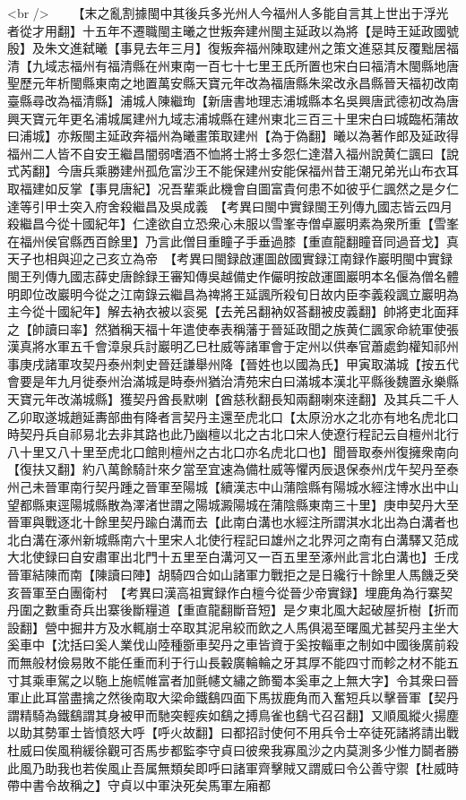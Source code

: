 <br />
　　【末之亂割據閩中其後兵多光州人今福州人多能自言其上世出于浮光者從才用翻】十五年不遷職閩主曦之世叛奔建州閩主延政以為將【是時王延政國號殷】及朱文進弑曦【事見去年三月】復叛奔福州陳取建州之策文進惡其反覆黜居福清【九域志福州有福清縣在州東南一百七十七里王氏所置也宋白曰福清木閩縣地唐聖歷元年析閩縣東南之地置萬安縣天寶元年改為福唐縣朱梁改永昌縣晉天福初改南臺縣尋改為福清縣】浦城人陳繼珣【新唐書地理志浦城縣本名吳興唐武德初改為唐興天寶元年更名浦城属建州九域志浦城縣在建州東北三百三十里宋白曰城臨柘蒲故曰浦城】亦叛閩主延政奔福州為曦畫策取建州【為于偽翻】曦以為著作郎及延政得福州二人皆不自安王繼昌闇弱嗜酒不恤將士將士多怨仁達潜入福州說黄仁諷曰【說式芮翻】今唐兵乘勝建州孤危富沙王不能保建州安能保福州昔王潮兄弟光山布衣耳取福建如反掌【事見唐紀】况吾輩乘此機會自圖富貴何患不如彼乎仁諷然之是夕仁達等引甲士突入府舍殺繼昌及吳成義　【考異曰閩中實録閩王列傳九國志皆云四月殺繼昌今從十國紀年】仁達欲自立恐衆心未服以雪峯寺僧卓巖明素為衆所重【雪峯在福州侯官縣西百餘里】乃言此僧目重瞳子手垂過膝【重直龍翻瞳音同過音戈】真天子也相與迎之己亥立為帝　【考異曰閩録啟運圖啟國實録江南録作巖明閩中實録閩王列傳九國志薛史唐餘録王審知傳吳越備史作儼明按啟運圖巖明本名偃為僧名體明即位改巖明今從之江南錄云繼昌為禆將王延諷所殺旬日故内臣李義殺諷立巖明為主今從十國紀年】解去衲衣被以衮冕【去羌呂翻衲奴荅翻被皮義翻】帥將吏北面拜之【帥讀曰率】然猶稱天福十年遣使奉表稱藩于晉延政聞之族黄仁諷家命統軍使張漢真將水軍五千會漳泉兵討巖明乙巳杜威等諸軍會于定州以供奉官蕭處鈞權知祁州事庚戌諸軍攻契丹泰州刺史晉廷謙舉州降【晉姓也以國為氏】甲寅取滿城【按五代會要是年九月徙泰州治滿城是時泰州猶治清苑宋白曰滿城本漢北平縣後魏置永樂縣天寶元年改滿城縣】獲契丹酋長默喇【酋慈秋翻長知兩翻喇來逹翻】及其兵二千人乙卯取遂城趙延夀部曲有降者言契丹主還至虎北口【太原汾水之北亦有地名虎北口時契丹兵自祁易北去非其路也此乃幽檀以北之古北口宋人使遼行程記云自檀州北行八十里又八十里至虎北口館則檀州之古北口亦名虎北口也】聞晉取泰州復擁衆南向【復扶又翻】約八萬餘騎計來夕當至宜速為備杜威等懼丙辰退保泰州戊午契丹至泰州己未晉軍南行契丹踵之晉軍至陽城【續漢志中山蒲陰縣有陽城水經注博水出中山望都縣東逕陽城縣散為澤渚世謂之陽城澱陽城在蒲陰縣東南三十里】庚申契丹大至晉軍與戰逐北十餘里契丹踰白溝而去【此南白溝也水經注所謂淇水北出為白溝者也北白溝在涿州新城縣南六十里宋人北使行程記曰雄州之北界河之南有白溝驛又范成大北使録曰自安肅軍出北門十五里至白溝河又一百五里至涿州此言北白溝也】壬戌晉軍結陳而南【陳讀曰陣】胡騎四合如山諸軍力戰拒之是日纔行十餘里人馬饑乏癸亥晉軍至白團衛村　【考異曰漢高祖實録作白檀今從晉少帝實録】埋鹿角為行寨契丹圍之數重奇兵出寨後斷糧道【重直龍翻斷音短】是夕東北風大起破屋折樹【折而設翻】營中掘井方及水輒崩士卒取其泥帛絞而飲之人馬俱渴至曙風尤甚契丹主坐大奚車中【沈括曰奚人業伐山陸種斵車契丹之車皆資于奚按輜車之制如中國後廣前殺而無般材儉易敗不能任重而利于行山長轂廣輪輪之牙其厚不能四寸而軫之材不能五寸其乘車駕之以駞上施㡛帷富者加氈幰文繡之飾蜀本奚車之上無大字】令其衆曰晉軍止此耳當盡擒之然後南取大梁命鐵鷂四面下馬拔鹿角而入奮短兵以擊晉軍【契丹謂精騎為鐵鷂謂其身被甲而馳突輕疾如鷂之搏鳥雀也鷂弋召召翻】又順風縱火揚塵以助其勢軍士皆憤怒大呼【呼火故翻】曰都招討使何不用兵令士卒徒死諸將請出戰杜威曰俟風稍緩徐觀可否馬步都監李守貞曰彼衆我寡風沙之内莫測多少惟力鬬者勝此風乃助我也若俟風止吾属無類矣即呼曰諸軍齊擊賊又謂威曰令公善守禦【杜威時帶中書令故稱之】守貞以中軍決死矣馬軍左廂都